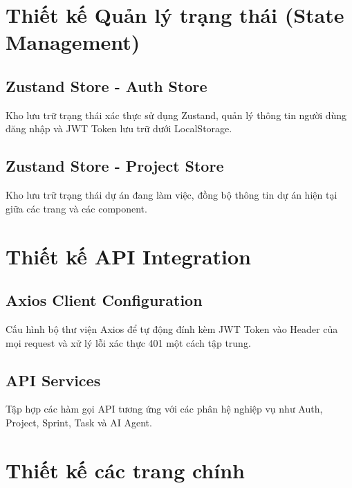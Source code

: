 \documentclass[12pt,a4paper]{report}
\begin{document}
\section{Thiết kế Quản lý trạng thái (State Management)}

\subsection{Zustand Store - Auth Store}

Kho lưu trữ trạng thái xác thực sử dụng Zustand, quản lý thông tin người dùng đăng nhập và JWT Token lưu trữ dưới LocalStorage.

\subsection{Zustand Store - Project Store}

Kho lưu trữ trạng thái dự án đang làm việc, đồng bộ thông tin dự án hiện tại giữa các trang và các component.

\section{Thiết kế API Integration}

\subsection{Axios Client Configuration}

Cấu hình bộ thư viện Axios để tự động đính kèm JWT Token vào Header của mọi request và xử lý lỗi xác thực 401 một cách tập trung.

\subsection{API Services}

Tập hợp các hàm gọi API tương ứng với các phân hệ nghiệp vụ như Auth, Project, Sprint, Task và AI Agent.

\section{Thiết kế các trang chính}
\end{document}
